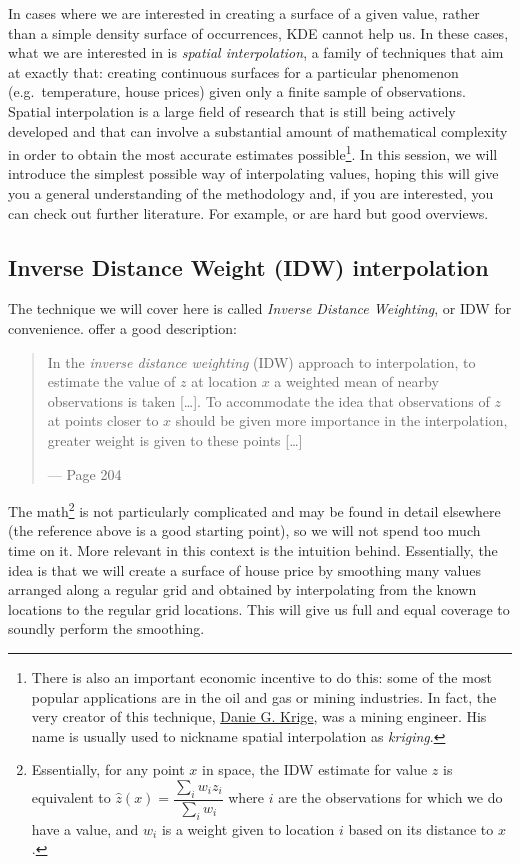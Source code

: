 \documentclass[
]{book}
\begin{document}
In cases where we are interested in creating a surface of a given value, rather than a simple density surface of occurrences, KDE cannot help us. In these cases, what we are interested in is \emph{spatial interpolation}, a family of techniques that aim at exactly that: creating continuous surfaces for a particular phenomenon (e.g.~temperature, house prices) given only a finite sample of observations. Spatial interpolation is a large field of research that is still being actively developed and that can involve a substantial amount of mathematical complexity in order to obtain the most accurate estimates possible\footnote{There is also an important economic incentive to do this: some of the most popular applications are in the oil and gas or mining industries. In fact, the very creator of this technique, \href{https://en.wikipedia.org/wiki/Danie_G._Krige}{Danie G. Krige}, was a mining engineer. His name is usually used to nickname spatial interpolation as \emph{kriging}.}. In this session, we will introduce the simplest possible way of interpolating values, hoping this will give you a general understanding of the methodology and, if you are interested, you can check out further literature. For example, \citet{banerjee2014hierarchical} or \citet{cressie2015statistics} are hard but good overviews.

\hypertarget{inverse-distance-weight-idw-interpolation}{%
\subsection{Inverse Distance Weight (IDW) interpolation}\label{inverse-distance-weight-idw-interpolation}}

The technique we will cover here is called \emph{Inverse Distance Weighting}, or IDW for convenience. \citet{comber2015} offer a good description:

\begin{quote}
In the \emph{inverse distance weighting} (IDW) approach to interpolation, to estimate the value of \(z\) at location \(x\) a weighted mean of nearby observations is taken {[}\ldots{]}. To accommodate the idea that observations of \(z\) at points closer to \(x\) should be given more importance in the interpolation, greater weight is given to these points {[}\ldots{]}

--- Page 204
\end{quote}

The math\footnote{Essentially, for any point \(x\) in space, the IDW estimate for value \(z\) is equivalent to \(\hat{z} (x) = \dfrac{\sum_i w_i z_i}{\sum_i w_i}\) where \(i\) are the observations for which we do have a value, and \(w_i\) is a weight given to location \(i\) based on its distance to \(x\).} is not particularly complicated and may be found in detail elsewhere (the reference above is a good starting point), so we will not spend too much time on it. More relevant in this context is the intuition behind. Essentially, the idea is that we will create a surface of house price by smoothing many values arranged along a regular grid and obtained by interpolating from the known locations to the regular grid locations. This will give us full and equal coverage to soundly perform the smoothing.
\end{document}
